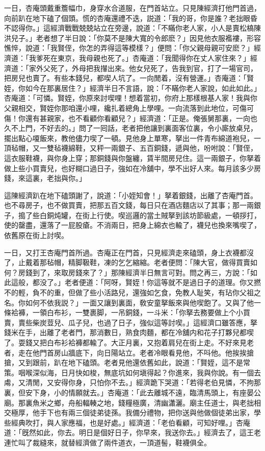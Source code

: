 一日，杏庵頭戴重簷幅巾，身穿水合道服，在門首站立。只見陳經濟打他門首過，向前趴在地下磕了個頭。慌的杏庵還禮不迭，説道：「我的哥，你是誰？老拙眼昏不認得你。」這經濟戰戰兢兢站立在旁邊，說道：「不瞞你老人家，小人是賣松槁陳洪兒子。」老者想了半日說：「你莫不是陳大寬的令郎麽？」因見他衣服襤褸，形容憔悴，說道：「我賢侄，你怎的弄得這等模樣？」便問：「你父親母親可安麽？」經濟道：「我爹死在東京，我母親也死了。」杏庵道：「我聞得你在丈人家住來？」經濟道：「家外父死了，外母把我攆出來。他女兒死了，告我到官，打了一場官司，把房兒也賣了。有些本錢兒，都喫人坑了。一向閒着，沒有營運。」杏庵道：「賢姪，你如今在那裏居住？」經濟半日不言語，說：「不瞞你老人家說，如此如此。」杏庵道：「可憐。賢姪，你原來討喫哩！想着當初，你府上那樣根基人家！我與你父親相交，賢姪你那咱還小哩，纔扎着總角上學哩。一向流落到此地位，可傷可傷！你還有甚親家，也不看顧你看顧兒？」經濟道：「正是。俺張舅那裏，一向也久不上門，不好去的。」問了一囘話，老者把他讓到裏面客位裏，令小廝放桌兒，擺出點心嗄飯來，教他儘力喫了一頓。見他身上單寒，拏出一件青布綿道袍兒，一頂毡帽，又一雙毡襪綿鞋，又秤一兩銀子、五百銅錢，遞與他，吩咐說：「賢侄，這衣服鞋襪，與你身上穿；那銅錢與你盤纏，賃半間房兒住。這一兩銀子，你拏着做上些小買賣兒，也好糊口過日子，強如在冷舖中，學不出好人來。每月該多少房錢，來這裏，老拙與你。」

這陳經濟趴在地下磕頭謝了，說道：「小姪知會！」拏着銀錢，出離了杏庵門首。也不尋房子，也不做買賣，把那五百文錢，每日只在酒店麵店以了其事；那一兩銀子，搗了些白銅炖罐，在街上行使。喫巡邏的當土賊拏到該坊節級處，一頓拶打，使的罄盡，還落了一屁股瘡。不消兩日，把身上綿衣也輸了，襪兒也換來嘴喫了，依舊原在街上討喫。

一日，又打王杏庵門首所過。杏庵正在門首，只見經濟走來磕頭，身上衣襪都沒了，止戴着那毡帽，精脚靸鞋，凍的乞乞縮縮。老者便問：「陳大官，做得買賣如何？房錢到了，來取房錢來了？」那陳經濟半日無言可對。問之再三，方說：「如此這般，都没了。」老者便道：「阿呀，賢姪！你這等就不是過日子的道理。你又撚不的輕，負不的重，但做了些小活路兒，還強如乞食，免教人耻笑，有玷你父祖之名。你如何不依我説？」一面又讓到裏面，敎安童拏飯來與他喫飽了。又與了他一條袷褲，一領白布衫，一雙裹脚，一吊銅錢，一斗米：「你拏去務要做上个小買賣，賣些柴炭荳兒、瓜子兒，也過了日子，強似這等討喫。」這經濟口雖答應，拏錢米在手，出離了老者門，那消數日，熟食肉麵，都在冷舖内和花子打夥兒都喫了。耍錢又把白布衫袷褲都輸了。大正月裏，又抱着肩兒在街上走。不好來見老者，走在他門首房山牆底下，向日陽站立。老者冷眼看見他，不呌他。他挨挨搶搶，又到跟前，趴在地下磕頭。老者見他還依舊如此，說道：「賢姪，這不是常策。咽喉深似海，日月快如梭，無底坑如何塡得起？你進來，我與你說。有一個去䖏，又清閒，又安得你身，只怕你不去。」經濟跪下哭道：「若得老伯見憐，不拘那裏，但安下身，小的情願就去。」杏庵道：「此去離城不遠，臨清馬頭上，有座晏公廟。那裏魚米之鄉，舟船輻輳之地，錢糧極廣，清幽瀟灑。廟主任道士，與老拙相交極厚，他手下也有兩三個徒弟徒孫。我備分禮物，把你送與他做個徒弟出家，學些經典吹打，與人家應福，也是好處。」經濟道：「老伯看顧，可知好哩。」杏庵道：「旣然如此，你去。明日是個好日子，你早來，我送你去。」經濟去了，這王老連忙叫了裁縫來，就替經濟做了兩件道衣，一頂道髻，鞋襪俱全。

